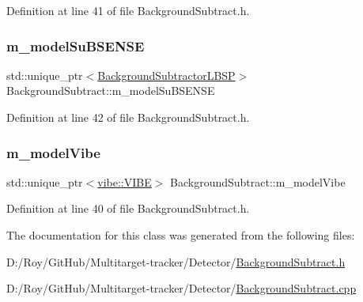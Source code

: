 Definition at line 41 of file Background\+Subtract.\+h.

\mbox{\label{class_background_subtract_a56275963c8cacca97b97d0cde884f4c1}} 
\subsubsection{\texorpdfstring{m\+\_\+model\+Su\+B\+S\+E\+N\+SE}{m\_modelSuBSENSE}}
{\footnotesize\ttfamily std\+::unique\+\_\+ptr$<$\mbox{\hyperlink{class_background_subtractor_l_b_s_p}{Background\+Subtractor\+L\+B\+SP}}$>$ Background\+Subtract\+::m\+\_\+model\+Su\+B\+S\+E\+N\+SE\hspace{0.3cm}{\ttfamily [private]}}



Definition at line 42 of file Background\+Subtract.\+h.

\mbox{\label{class_background_subtract_a57c251abeed9a2c73a3c97d0f7f8b527}} 
\subsubsection{\texorpdfstring{m\+\_\+model\+Vibe}{m\_modelVibe}}
{\footnotesize\ttfamily std\+::unique\+\_\+ptr$<$\mbox{\hyperlink{classvibe_1_1_v_i_b_e}{vibe\+::\+V\+I\+BE}}$>$ Background\+Subtract\+::m\+\_\+model\+Vibe\hspace{0.3cm}{\ttfamily [private]}}



Definition at line 40 of file Background\+Subtract.\+h.



The documentation for this class was generated from the following files\+:\begin{DoxyCompactItemize}
\item 
D\+:/\+Roy/\+Git\+Hub/\+Multitarget-\/tracker/\+Detector/\mbox{\hyperlink{_background_subtract_8h}{Background\+Subtract.\+h}}\item 
D\+:/\+Roy/\+Git\+Hub/\+Multitarget-\/tracker/\+Detector/\mbox{\hyperlink{_background_subtract_8cpp}{Background\+Subtract.\+cpp}}\end{DoxyCompactItemize}
